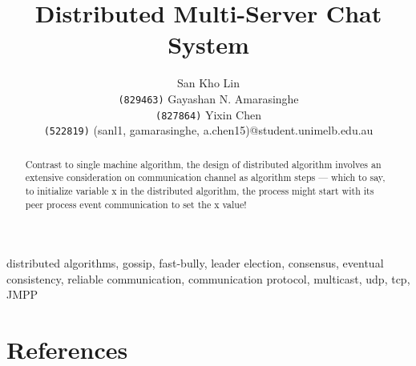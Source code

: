 \documentclass[11pt]{article}
\title{Distributed Multi-Server Chat System}
\author{San Kho Lin \\ \texttt{(829463)} \And
Gayashan N. Amarasinghe \\ \texttt{(827864)} \And
Yixin Chen \\ \texttt{(522819)} \AND
(sanl1, gamarasinghe, a.chen15)@student.unimelb.edu.au}
\begin{document}
\maketitle



\begin{abstract}
Contrast to single machine algorithm, the design of distributed algorithm involves an extensive consideration on communication channel as algorithm steps --- which to say, to initialize variable x in the distributed algorithm, the process might start with its peer process event communication to set the x value!
\end{abstract}

\begin{keywords} 
distributed algorithms, gossip, fast-bully, leader election, consensus, eventual consistency, reliable communication, communication protocol, multicast, udp, tcp, JMPP
\end{keywords}












\newpage



\newpage



\newpage

\section{References}
\printbibliography[heading=none]

\newpage


\end{document}
